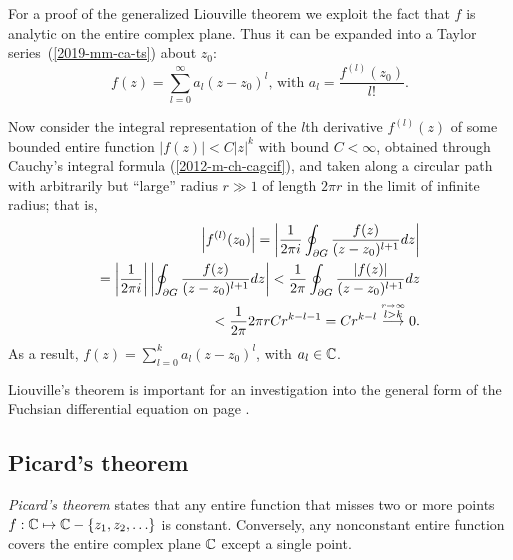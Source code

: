 {\color{OliveGreen}
\bproof
For a proof of the generalized Liouville theorem
we exploit the fact that $f$ is analytic on the entire complex plane.
Thus it can be expanded into a Taylor series~(\ref{2019-mm-ca-ts}) about $z_0$:
 \begin{equation}
f(z) = \sum_{l=0}^\infty a_l (z-z_0)^l \text{, with } a_l=\frac{f^{(l)}(z_0)}{l!}  .
 \end{equation}

Now consider the integral representation of the $l$th derivative $f^{(l)}(z)$
of some bounded entire function $\vert f(z)\vert < C \vert z \vert^k $ with bound $C <\infty$,
obtained through Cauchy's integral formula (\ref{2012-m-ch-cagcif}),  and
taken along a circular path with arbitrarily but ``large'' radius $r \gg 1$ of length $2\pi r$ in the limit of infinite radius;
that is,
 \begin{equation}
\begin{split}
\left| f^{(l)}(z_0) \right| = \left|
{1\over 2\pi i}\oint_{\partial G}{f(z)\over
 (z-z_0)^{l+1}}dz
\right|   \\
=
\left|
{1\over 2\pi i}
\right|
\left|
\oint_{\partial G}{  f(z)  \over
 (z-z_0)^{l+1}}dz \right|
<
{1\over 2\pi }
\oint_{\partial G}{ \left| f(z)\right|  \over
 (z-z_0)^{l+1}}dz   \\
<  \frac{1}{2\pi } 2\pi r   C r^{k-l-1}
=  C r^{k-l}  \stackrel{\overset{r\rightarrow \infty}{l>k}}{\longrightarrow} 0   .
\end{split}
 \end{equation}
As a result, $f(z)= \sum_{l=0}^k a_l (z-z_0)^l$, with $a_l\in {\Bbb C}$.
\eproof
}

Liouville's theorem is important for an investigation into the general form of
the Fuchsian differential equation
on page
\pageref{2014-m-ch-sf-glt}.






\subsection{Picard's theorem}
\label{2012-m-ch-ca-pt}
{\em Picard's theorem}
states that any entire function that misses two or more points
$f: {\Bbb C} \mapsto  {\Bbb C} - \{z_1,z_2,\ldots \}$
is constant.
Conversely, any nonconstant entire function covers the entire
complex plane ${\Bbb C}$ except a single point.

